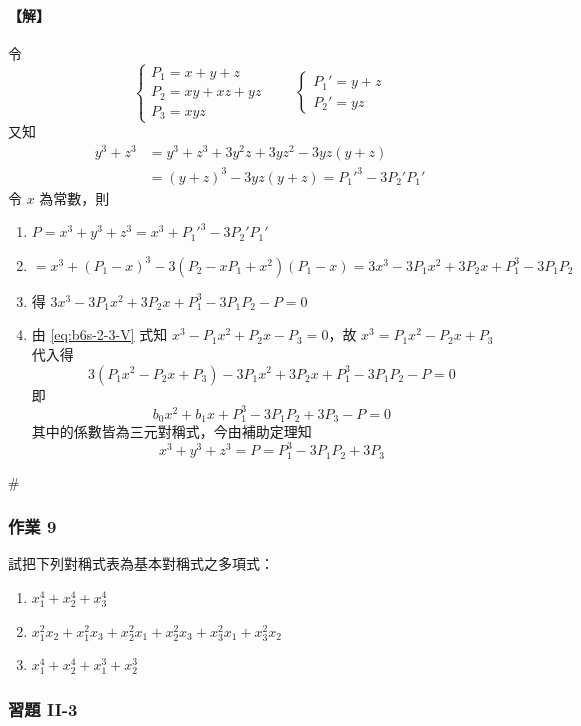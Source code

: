 \paragraph{【解】}
令
\[ \begin{cases}
P_1 = x+y+z \\
P_2 = xy+xz+yz \\
P_3 = xyz
\end{cases} \qquad \begin{cases}
P_1' = y+z \\
P_2' = yz
\end{cases} \]
又知
\begin{align*}
y^3+z^3 &= y^3+z^3+3y^2z+3yz^2 - 3yz(y+z) \\
&= (y+z)^3 - 3yz(y+z) = P_1'^3 - 3P_2'P_1'
\end{align*}
令 $x$ 為常數，則
\begin{enumerate}[label=(\Roman*), leftmargin=2em]
  \item $P = x^3+y^3+z^3 = x^3 + P_1'^3 - 3P_2'P_1'$
  \item $= x^3 + (P_1-x)^3 - 3(P_2 - x P_1 + x^2)(P_1-x) = 3x^3 - 3P_1 x^2 + 3P_2 x + P_1^3 - 3P_1 P_2$
  \item 得 $3x^3 - 3P_1 x^2 + 3P_2 x + P_1^3 - 3P_1 P_2 - P = 0$
  \item 由 \eqref{eq:b6s-2-3-V} 式知 $x^3 - P_1 x^2 + P_2 x - P_3 = 0$，故 $x^3 = P_1 x^2 - P_2 x + P_3$ 代入得
  \[ 3(P_1 x^2 - P_2 x + P_3) - 3P_1 x^2 + 3P_2 x + P_1^3 - 3P_1 P_2 - P = 0 \]
  即
  \[ b_0 x^2 + b_1 x + P_1^3 - 3P_1 P_2 + 3P_3 - P = 0 \]
  其中的係數皆為三元對稱式，今由補助定理知
  \[ x^3+y^3+z^3 = P = P_1^3 - 3P_1 P_2 + 3P_3 \]
\end{enumerate}
\hfill$\#$

\subsubsection*{作業 9}\label{hw:b6s-2-9}
試把下列對稱式表為基本對稱式之多項式：
\begin{enumerate}[label=(\roman*)]
  \item $x_1^4 + x_2^4 + x_3^4$
  \item $x_1^2 x_2 + x_1^2 x_3 + x_2^2 x_1 + x_2^2 x_3 + x_3^2 x_1 + x_3^2 x_2$
  \item $x_1^4 + x_2^4 + x_1^3 + x_2^3$
\end{enumerate}

\subsubsection*{習題 II-3}\label{sec:b6s-ex2-3}

